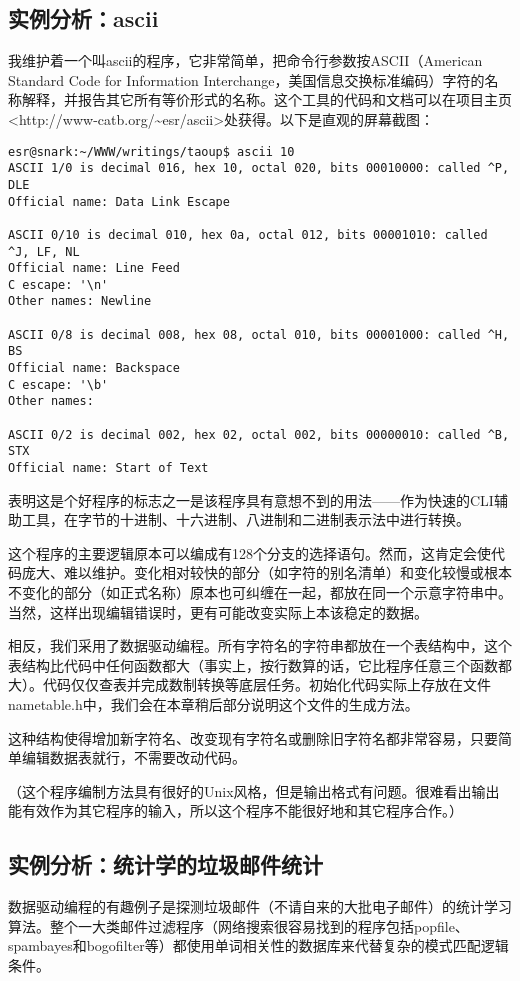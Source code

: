\documentclass[12pt,oneside]{book}
\begin{document}
\begin{common-format}
\subsection{实例分析：ascii}
我维护着一个叫ascii的程序，它非常简单，把命令行参数按ASCII（American Standard Code for Information Interchange，美国信息交换标准编码）字符的名称解释，并报告其它所有等价形式的名称。这个工具的代码和文档可以在项目主页<http://www-catb.org/\~{}esr/ascii>处获得。以下是直观的屏幕截图：

\begin{Verbatim}
esr@snark:~/WWW/writings/taoup$ ascii 10
ASCII 1/0 is decimal 016, hex 10, octal 020, bits 00010000: called ^P, DLE
Official name: Data Link Escape

ASCII 0/10 is decimal 010, hex 0a, octal 012, bits 00001010: called ^J, LF, NL
Official name: Line Feed
C escape: '\n'
Other names: Newline

ASCII 0/8 is decimal 008, hex 08, octal 010, bits 00001000: called ^H, BS
Official name: Backspace
C escape: '\b'
Other names:

ASCII 0/2 is decimal 002, hex 02, octal 002, bits 00000010: called ^B, STX
Official name: Start of Text
\end{Verbatim}

表明这是个好程序的标志之一是该程序具有意想不到的用法——作为快速的CLI辅助工具，在字节的十进制、十六进制、八进制和二进制表示法中进行转换。

这个程序的主要逻辑原本可以编成有128个分支的选择语句。然而，这肯定会使代码庞大、难以维护。变化相对较快的部分（如字符的别名清单）和变化较慢或根本不变化的部分（如正式名称）原本也可纠缠在一起，都放在同一个示意字符串中。当然，这样出现编辑错误时，更有可能改变实际上本该稳定的数据。

相反，我们采用了数据驱动编程。所有字符名的字符串都放在一个表结构中，这个表结构比代码中任何函数都大（事实上，按行数算的话，它比程序任意三个函数都大）。代码仅仅查表并完成数制转换等底层任务。初始化代码实际上存放在文件nametable.h中，我们会在本章稍后部分说明这个文件的生成方法。

这种结构使得增加新字符名、改变现有字符名或删除旧字符名都非常容易，只要简单编辑数据表就行，不需要改动代码。

（这个程序编制方法具有很好的Unix风格，但是输出格式有问题。很难看出输出能有效作为其它程序的输入，所以这个程序不能很好地和其它程序合作。）

\subsection{实例分析：统计学的垃圾邮件统计}
数据驱动编程的有趣例子是探测垃圾邮件（不请自来的大批电子邮件）的统计学习算法。整个一大类邮件过滤程序（网络搜索很容易找到的程序包括popfile、spambayes和bogofilter等）都使用单词相关性的数据库来代替复杂的模式匹配逻辑条件。


\end{common-format}
\end{document}
